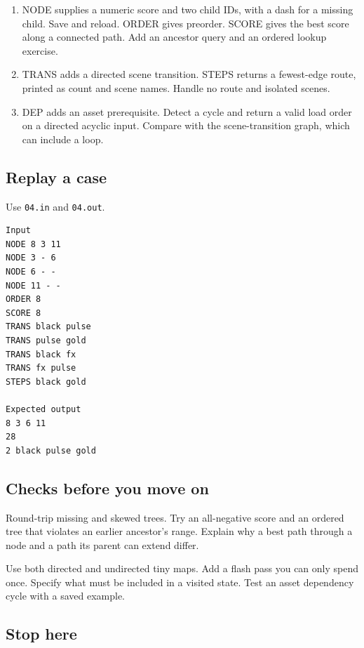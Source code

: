 \documentclass[11pt,letterpaper]{article}
\begin{document}
\begin{enumerate}
\item NODE supplies a numeric score and two child IDs, with a dash for a missing child. Save and reload. ORDER gives preorder. SCORE gives the best score along a connected path. Add an ancestor query and an ordered lookup exercise.
\item TRANS adds a directed scene transition. STEPS returns a fewest-edge route, printed as count and scene names. Handle no route and isolated scenes.
\item DEP adds an asset prerequisite. Detect a cycle and return a valid load order on a directed acyclic input. Compare with the scene-transition graph, which can include a loop.
\end{enumerate}

\subsection*{Replay a case}

Use \texttt{04.in} and \texttt{04.out}.

\begin{samepage}
\small
\begin{verbatim}
Input
NODE 8 3 11
NODE 3 - 6
NODE 6 - -
NODE 11 - -
ORDER 8
SCORE 8
TRANS black pulse
TRANS pulse gold
TRANS black fx
TRANS fx pulse
STEPS black gold

Expected output
8 3 6 11
28
2 black pulse gold
\end{verbatim}
\end{samepage}

\subsection*{Checks before you move on}

Round-trip missing and skewed trees. Try an all-negative score and an ordered tree that violates an earlier ancestor's range. Explain why a best path through a node and a path its parent can extend differ.

Use both directed and undirected tiny maps. Add a flash pass you can only spend once. Specify what must be included in a visited state. Test an asset dependency cycle with a saved example.

\subsection*{Stop here}
\end{document}
